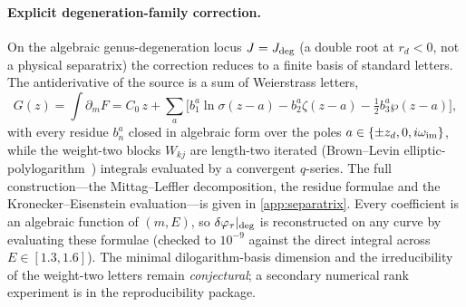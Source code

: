 \documentclass[12pt]{iopart}
\begin{document}
\paragraph{Explicit degeneration-family correction.} On the algebraic genus-degeneration
locus $J=J_{\rm deg}$ (a double root at $r_d<0$, not a physical separatrix) the correction
reduces to a finite basis of standard letters. The antiderivative of the source is a sum
of Weierstrass letters,
\begin{equation}
    G(z)=\int\partial_m F=C_0\,z+\sum_a\Big[b_1^a\ln\sigma(z-a)-b_2^a\zeta(z-a)
        -\tfrac12 b_3^a\wp(z-a)\Big],
    \label{eq:vaidya-sep-G}
\end{equation}
with every residue $b_n^a$ closed in algebraic form over the poles
$a\in\{\pm z_d,0,i\omega_{\rm im}\}$, while the weight-two blocks $W_{kj}$ are length-two
iterated (Brown--Levin elliptic-polylogarithm~\cite{BrownLevin2011}) integrals evaluated by
a convergent $q$-series. The full construction---the Mittag--Leffler decomposition, the
residue formulae and the Kronecker--Eisenstein evaluation---is given in
\ref{app:separatrix}. Every coefficient is an algebraic function of $(m,E)$, so
$\delta\varphi_\tau|_{\rm deg}$ is reconstructed on any curve by evaluating these formulae
(checked to $10^{-9}$ against the direct integral across $E\in[1.3,1.6]$). The minimal
dilogarithm-basis dimension and the irreducibility of the weight-two letters remain
\emph{conjectural}; a secondary numerical rank experiment is in the reproducibility
package.
\end{document}
